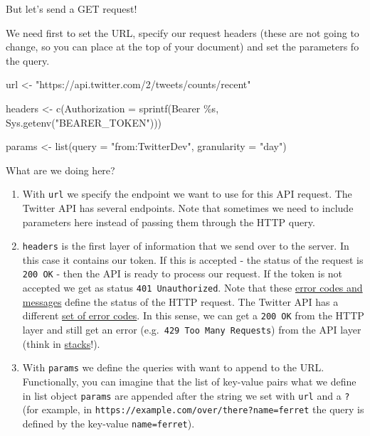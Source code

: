 \documentclass[
]{article}
\newenvironment{Shaded}{\begin{snugshade}}{\end{snugshade}}
\newcommand{\AttributeTok}[1]{\textcolor[rgb]{0.77,0.63,0.00}{#1}}
\newcommand{\FunctionTok}[1]{\textcolor[rgb]{0.00,0.00,0.00}{#1}}
\newcommand{\NormalTok}[1]{#1}
\newcommand{\OtherTok}[1]{\textcolor[rgb]{0.56,0.35,0.01}{#1}}
\newcommand{\StringTok}[1]{\textcolor[rgb]{0.31,0.60,0.02}{#1}}
\begin{document}
But let's send a GET request!

We need first to set the URL, specify our request headers (these are not going to change, so you can place at the top of your document) and set the parameters fo the query.

\begin{Shaded}
\begin{Highlighting}[]
\NormalTok{url }\OtherTok{\textless{}{-}} 
  \StringTok{"https://api.twitter.com/2/tweets/counts/recent"}

\NormalTok{headers }\OtherTok{\textless{}{-}} 
  \FunctionTok{c}\NormalTok{(}\StringTok{\textasciigrave{}}\AttributeTok{Authorization}\StringTok{\textasciigrave{}} \OtherTok{=} \FunctionTok{sprintf}\NormalTok{(}\StringTok{\textquotesingle{}Bearer \%s\textquotesingle{}}\NormalTok{, }
                              \FunctionTok{Sys.getenv}\NormalTok{(}\StringTok{"BEARER\_TOKEN"}\NormalTok{)))}

\NormalTok{params }\OtherTok{\textless{}{-}} 
  \FunctionTok{list}\NormalTok{(}\AttributeTok{query =} \StringTok{"from:TwitterDev"}\NormalTok{,}
       \AttributeTok{granularity =} \StringTok{"day"}\NormalTok{)}
\end{Highlighting}
\end{Shaded}

What are we doing here?

\begin{enumerate}
\def\labelenumi{\arabic{enumi}.}
\item
  With \texttt{url} we specify the endpoint we want to use for this API request. The Twitter API has several endpoints. Note that sometimes we need to include parameters here instead of passing them through the HTTP query.
\item
  \texttt{headers} is the first layer of information that we send over to the server. In this case it contains our token. If this is accepted - the status of the request is \texttt{200\ OK} - then the API is ready to process our request. If the token is not accepted we get as status \texttt{401\ Unauthorized}. Note that these \href{https://developer.mozilla.org/en-US/docs/Web/HTTP/Status}{error codes and messages} define the status of the HTTP request. The Twitter API has a different \href{https://developer.twitter.com/en/support/twitter-api/error-troubleshooting}{set of error codes}. In this sense, we can get a \texttt{200\ OK} from the HTTP layer and still get an error (e.g.~\texttt{429\ Too\ Many\ Requests}) from the API layer (think in \href{https://en.wikipedia.org/wiki/Protocol_stack}{stacks}!).
\item
  With \texttt{params} we define the queries with want to append to the URL. Functionally, you can imagine that the list of key-value pairs what we define in list object \texttt{params} are appended after the string we set with \texttt{url} and a \texttt{?} (for example, in \texttt{https://example.com/over/there?name=ferret} the query is defined by the key-value \texttt{name=ferret}).
\end{enumerate}
\end{document}
